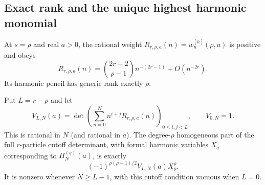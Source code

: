 \subsection{Exact rank and the unique highest harmonic monomial}

\begin{theorem}
\label{hier:rank}
At $s=\rho$ and real $a>0$, the rational weight
$R_{r,\rho,a}(n)=w_n^{[h]}(\rho,a)$ is positive and obeys
\begin{equation}\label{hier:critical}
 R_{r,\rho,a}(n)=\binom{2r-2}{\rho-1}n^{-(2r-1)}
                                      +O(n^{-2r}).
\end{equation}
Its harmonic pencil has generic rank exactly $\rho$.

Put $L=r-\rho$ and let
\begin{equation}\label{hier:Vcutoff}
 V_{L,N}(a)=\det\left(
   \sum_{n=0}^N n^{i+j}R_{r,\rho,a}(n)\right)_{0\le i,j<L},
 \qquad V_{0,N}=1.
\end{equation}
This is rational in $N$ (and rational in $a$).  The degree-$\rho$
homogeneous part of the full $r$-particle cutoff determinant, with
formal harmonic variables $X_q$ corresponding to $H_N^{(q)}(a)$, is
exactly
\begin{equation}\label{hier:top}
 \boxed{\displaystyle
 (-1)^{\rho(\rho-1)/2}V_{L,N}(a)X_\rho^\rho.}
\end{equation}
It is nonzero whenever $N\ge L-1$, with this cutoff condition vacuous
when $L=0$.
\end{theorem}
